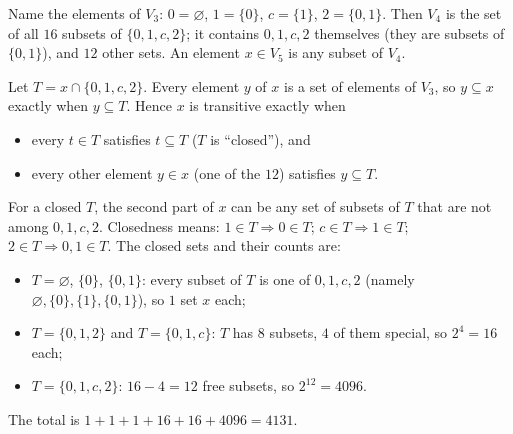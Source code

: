 Name the elements of $V_3$: $0=\varnothing$, $1=\{0\}$, $c=\{1\}$, $2=\{0,1\}$. Then $V_4$ is the set of all $16$ subsets of $\{0,1,c,2\}$; it contains $0,1,c,2$ themselves (they are subsets of $\{0,1\}$), and $12$ other sets. An element $x\in V_5$ is any subset of $V_4$.

Let $T=x\cap\{0,1,c,2\}$. Every element $y$ of $x$ is a set of elements of $V_3$, so $y\subseteq x$ exactly when $y\subseteq T$. Hence $x$ is transitive exactly when
\begin{itemize}
\item every $t\in T$ satisfies $t\subseteq T$ ($T$ is ``closed''), and
\item every other element $y\in x$ (one of the $12$) satisfies $y\subseteq T$.
\end{itemize}
For a closed $T$, the second part of $x$ can be any set of subsets of $T$ that are not among $0,1,c,2$. Closedness means: $1\in T\Rightarrow0\in T$; $c\in T\Rightarrow1\in T$; $2\in T\Rightarrow0,1\in T$. The closed sets and their counts are:
\begin{itemize}
\item $T=\varnothing$, $\{0\}$, $\{0,1\}$: every subset of $T$ is one of $0,1,c,2$ (namely $\varnothing,\{0\},\{1\},\{0,1\}$), so $1$ set $x$ each;
\item $T=\{0,1,2\}$ and $T=\{0,1,c\}$: $T$ has $8$ subsets, $4$ of them special, so $2^4=16$ each;
\item $T=\{0,1,c,2\}$: $16-4=12$ free subsets, so $2^{12}=4096$.
\end{itemize}
The total is $1+1+1+16+16+4096=\boxed{4131}$.
